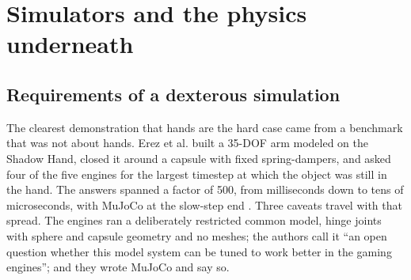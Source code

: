 \section{Simulators and the physics underneath}
\label{sec:simulators}

\subsection{Requirements of a dexterous simulation}
\label{sec:sim:requirements}


The clearest demonstration that hands are the hard case came from a benchmark that was not about
hands. Erez et al. built a 35-DOF arm modeled on the Shadow Hand, closed it around a capsule with
fixed spring-dampers, and asked four of the five engines for the largest timestep at which the
object was still in the hand. The answers spanned a factor of 500, from milliseconds down to tens of microseconds, with
MuJoCo at the slow-step end \cite[Sec.~IV-D]{physics_engine_comparison_2015}. Three caveats travel
with that spread. The engines ran a deliberately restricted common model, hinge joints with sphere
and capsule geometry and no meshes; the authors call it ``an open question whether this model
system can be tuned to work better in the gaming engines''; and they wrote MuJoCo and say so.


